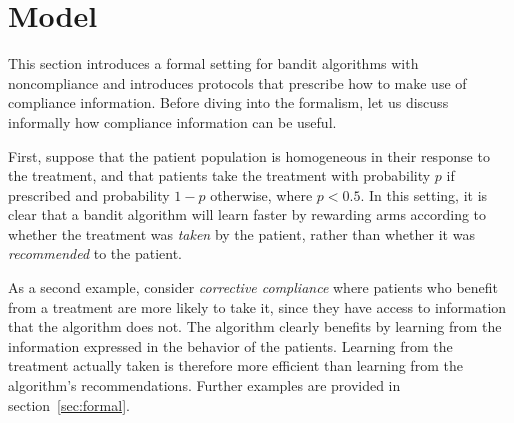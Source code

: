 \section{Model}
\label{sec:noncompliance}

This section introduces a formal setting for bandit algorithms with noncompliance and introduces protocols that prescribe how to make use of compliance information. Before diving into the formalism, let us discuss informally how compliance information can be useful. 

First, suppose that the patient population is homogeneous in their response to the treatment, and that patients take the treatment with probability $p$ if prescribed and probability $1-p$ otherwise, where $p<0.5$. In this setting, it is clear that a bandit algorithm will learn faster by rewarding arms according to whether the treatment was \emph{taken} by the patient, rather than whether it was \emph{recommended} to the patient. 

As a second example, consider \emph{corrective compliance} where patients who benefit from a treatment are more likely to take it, since they have access to information that the algorithm does not. The algorithm clearly benefits by learning from the information expressed in the behavior of the patients. Learning from the treatment actually taken is therefore more efficient than learning from the algorithm's recommendations. Further examples are provided in section~\ref{sec:formal}.



